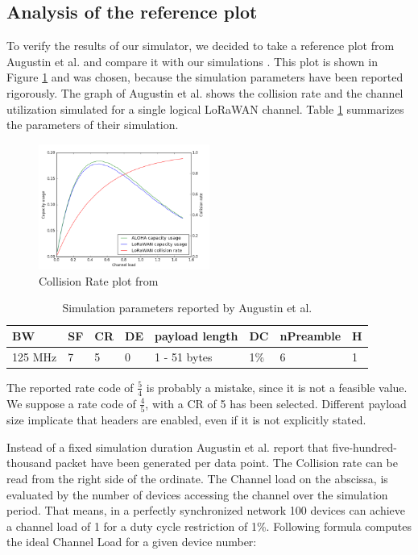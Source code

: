 \documentclass{article}
\begin{document}
\subsection{Analysis of the reference plot}
To verify the results of our simulator, we decided to take a reference plot
from Augustin et al. and compare it with our simulations
\cite{augustin2016study}. This plot is shown in Figure
\ref{fig:collissionrateaugustin} and was chosen, because the simulation
parameters have been reported rigorously. The graph of Augustin et al. shows
the collision rate and the channel utilization simulated for a single logical
LoRaWAN channel. Table \ref{table:augustinparams} summarizes the parameters of
their simulation.

\begin{figure}
    \centering
    \includegraphics[width=0.5\textwidth]{./figures/a_study_of_lora_collision_rate}
    \caption{Collision Rate plot from \cite{augustin2016study}}
    \label{fig:collissionrateaugustin}
\end{figure}

\begin{table}
\begin{tabular}{ | l | l | l | l | l | l | l | l | }
\hline
        BW      & SF & CR & DE & payload length  & DC   & nPreamble & H \\
\hline
        125 MHz & 7  & 5  & 0  & 1 - 51 bytes    & 1\%  &   6       & 1 \\
\hline
\end{tabular}
\caption{Simulation parameters reported by Augustin et al.
        \cite{augustin2016study}}
\label{table:augustinparams}
\end{table}

The reported rate code of $\frac{5}{4}$ is probably a mistake, since it is not
a feasible value. We suppose a rate code of $\frac{4}{5}$, with a CR of 5 has
been selected. Different payload size implicate that headers are enabled, even
if it is not explicitly stated.

Instead of a fixed simulation duration Augustin et al. report that
five-hundred-thousand packet have been generated per data point. The Collision
rate can be read from the right side of the ordinate. The Channel load on the
abscissa, is evaluated by the number of devices accessing the channel over the
simulation period. That means, in a perfectly synchronized network 100 devices
can achieve a channel load of 1 for a duty cycle restriction of 1\%. Following
formula computes the ideal Channel Load for a given device number: 
\end{document}
